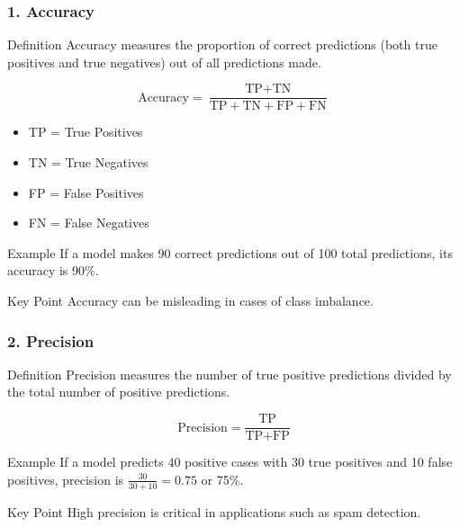 \documentclass[aspectratio=169]{beamer}
\begin{document}
\begin{frame}[fragile]
    \frametitle{1. Accuracy}
    
    \begin{block}{Definition}
        Accuracy measures the proportion of correct predictions (both true positives and true negatives) out of all predictions made.
    \end{block}

    \begin{equation}
    \text{Accuracy} = \frac{\text{TP} + \text{TN}}{\text{TP} + \text{TN} + \text{FP} + \text{FN}}
    \end{equation}
    
    \begin{itemize}
        \item TP = True Positives
        \item TN = True Negatives
        \item FP = False Positives
        \item FN = False Negatives
    \end{itemize}
    
    \begin{block}{Example}
        If a model makes 90 correct predictions out of 100 total predictions, its accuracy is 90\%.
    \end{block}
    
    \begin{block}{Key Point}
        Accuracy can be misleading in cases of class imbalance.
    \end{block}
\end{frame}

\begin{frame}[fragile]
    \frametitle{2. Precision}
    
    \begin{block}{Definition}
        Precision measures the number of true positive predictions divided by the total number of positive predictions.
    \end{block}

    \begin{equation}
    \text{Precision} = \frac{\text{TP}}{\text{TP} + \text{FP}}
    \end{equation}
    
    \begin{block}{Example}
        If a model predicts 40 positive cases with 30 true positives and 10 false positives, precision is \( \frac{30}{30 + 10} = 0.75 \) or 75\%.
    \end{block}
    
    \begin{block}{Key Point}
        High precision is critical in applications such as spam detection.
    \end{block}
\end{frame}
\end{document}
